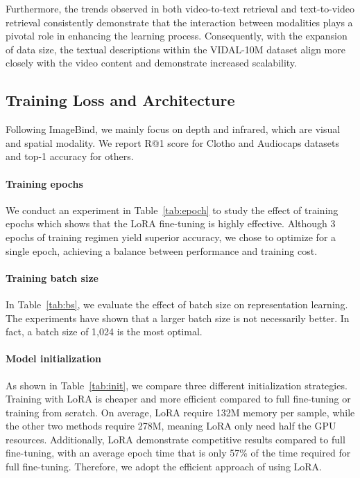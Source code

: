 \documentclass{article} \usepackage{iclr2024_conference,times}
\begin{document}
Furthermore, the trends observed in both video-to-text retrieval and text-to-video retrieval consistently demonstrate that the interaction between modalities plays a pivotal role in enhancing the learning process. Consequently, with the expansion of data size, the textual descriptions within the VIDAL-10M dataset align more closely with the video content and demonstrate increased scalability.
























\subsection{Training Loss and Architecture} 
Following ImageBind, we mainly focus on depth and infrared, which are visual and spatial modality. We report R@1 score for Clotho and Audiocaps datasets and top-1 accuracy for others.
\paragraph{Training epochs} 
We conduct an experiment in Table~\ref{tab:epoch} to study the effect of training epochs which shows that the LoRA fine-tuning is highly effective. Although 3 epochs of training regimen yield superior accuracy, we chose to optimize for a single epoch, achieving a balance between performance and training cost.

\paragraph{Training batch size} In Table~\ref{tab:bs}, we evaluate the effect of batch size on representation learning. The experiments have shown that a larger batch size is not necessarily better. In fact, a batch size of 1,024 is the most optimal.

\paragraph{Model initialization} As shown in Table~\ref{tab:init}, we compare three different initialization strategies. Training with LoRA is cheaper and more efficient compared to full fine-tuning or training from scratch. On average, LoRA require 132M memory per sample, while the other two methods require 278M, meaning LoRA only need half the GPU resources. Additionally, LoRA demonstrate competitive results compared to full fine-tuning, with an average epoch time that is only 57\% of the time required for full fine-tuning. Therefore, we adopt the efficient approach of using LoRA.
\end{document}

